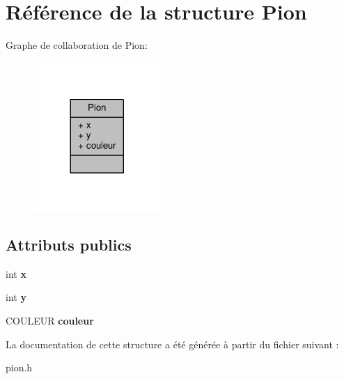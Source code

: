 \hypertarget{structPion}{}\section{Référence de la structure Pion}
\label{structPion}


Graphe de collaboration de Pion\+:\nopagebreak
\begin{figure}[H]
\begin{center}
\leavevmode
\includegraphics[width=137pt]{structPion__coll__graph}
\end{center}
\end{figure}
\subsection*{Attributs publics}
\begin{DoxyCompactItemize}
\item 
int {\bfseries x}\hypertarget{structPion_af6505c8de5ccc06d564945534272694c}{}\label{structPion_af6505c8de5ccc06d564945534272694c}

\item 
int {\bfseries y}\hypertarget{structPion_aa7fb8d98415132074045e4aebf7d97dd}{}\label{structPion_aa7fb8d98415132074045e4aebf7d97dd}

\item 
C\+O\+U\+L\+E\+UR {\bfseries couleur}\hypertarget{structPion_a1bb174054b197226d0c44f4a2920e409}{}\label{structPion_a1bb174054b197226d0c44f4a2920e409}

\end{DoxyCompactItemize}


La documentation de cette structure a été générée à partir du fichier suivant \+:\begin{DoxyCompactItemize}
\item 
pion.\+h\end{DoxyCompactItemize}
